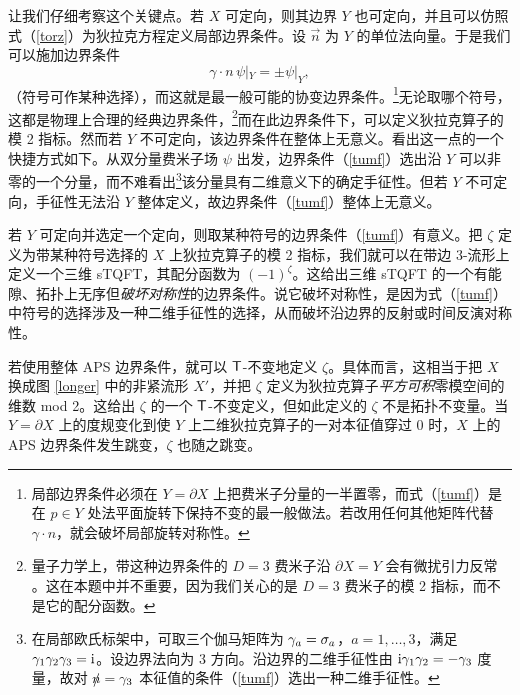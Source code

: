 让我们仔细考察这个关键点。若 $X$ 可定向，则其边界 $Y$ 也可定向，并且可以仿照式（\ref{torz}）为狄拉克方程定义局部边界条件。设 $\vec n$ 为 $Y$ 的单位法向量。于是我们可以施加边界条件
\begin{equation}\label{tumf}\gamma\cdot n\,\psi|_{Y}=\pm \psi|_Y,\end{equation}
（符号可作某种选择），而这就是最一般可能的协变边界条件。\footnote{局部边界条件必须在 $Y=\partial X$ 上把费米子分量的一半置零，而式（\ref{tumf}）是在 $p\in Y$ 处法平面旋转下保持不变的最一般做法。若改用任何其他矩阵代替 $\gamma\cdot n$，就会破坏局部旋转对称性。}无论取哪个符号，这都是物理上合理的经典边界条件，\footnote{量子力学上，带这种边界条件的 $D=3$ 费米子沿 $\partial X=Y$ 会有微扰引力反常 \cite{HW}。这在本题中并不重要，因为我们关心的是 $D=3$ 费米子的模 2 指标，而不是它的配分函数。}而在此边界条件下，可以定义狄拉克算子的模 2 指标。然而若 $Y$ 不可定向，该边界条件在整体上无意义。看出这一点的一个快捷方式如下。从双分量费米子场 $\psi$ 出发，边界条件（\ref{tumf}）选出沿 $Y$ 可以非零的一个分量，而不难看出\footnote{在局部欧氏标架中，可取三个伽马矩阵为 ${\gamma}_a=\sigma_a$，$a=1,\dots,3$，满足 ${\gamma}_1{\gamma}_2{\gamma}_3={\mathrm i}$。设边界法向为 3 方向。沿边界的二维手征性由 ${\mathrm i}{\gamma}_1{\gamma}_2=-{\gamma}_3$ 度量，故对 $\slashed{n}={\gamma}_3$ 本征值的条件（\ref{tumf}）选出一种二维手征性。}该分量具有二维意义下的确定手征性。但若 $Y$ 不可定向，手征性无法沿 $Y$ 整体定义，故边界条件（\ref{tumf}）整体上无意义。

若 $Y$ 可定向并选定一个定向，则取某种符号的边界条件（\ref{tumf}）有意义。把 $\zeta$ 定义为带某种符号选择的 $X$ 上狄拉克算子的模 2 指标，我们就可以在带边 3-流形上定义一个三维 sTQFT，其配分函数为 $(-1)^\zeta$。这给出三维 sTQFT 的一个有能隙、拓扑上无序但{\it 破坏对称性}的边界条件。说它破坏对称性，是因为式（\ref{tumf}）中符号的选择涉及一种二维手征性的选择，从而破坏沿边界的反射或时间反演对称性。

若使用整体 APS 边界条件，就可以 ${\sf T}$-不变地定义 $\zeta$。具体而言，这相当于把 $X$ 换成图 \ref{longer} 中的非紧流形 $X'$，并把 $\zeta$ 定义为狄拉克算子{\it 平方可积}零模空间的维数 mod 2。这给出 $\zeta$ 的一个 ${\sf T}$-不变定义，但如此定义的 $\zeta$ 不是拓扑不变量。当 $Y=\partial X$ 上的度规变化到使 $Y$ 上二维狄拉克算子的一对本征值穿过 0 时，$X$ 上的 APS 边界条件发生跳变，$\zeta$ 也随之跳变。


